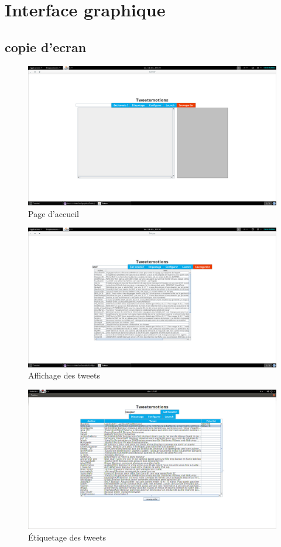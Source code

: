 \documentclass[a4paper,10pt]{report}
\begin{document}
  \section{Interface graphique}
    \subsection{copie d'ecran}
      \begin{figure}[H]
	\centering
	\includegraphics[scale=0.2]{impressions-ecran/accueil.png}
	\caption{Page d'accueil}
	\label{accueil}
      \end{figure}
      \begin{figure}[H]
	\centering
	\includegraphics[scale=0.2]{impressions-ecran/tweets.png}
	\caption{Affichage des tweets}
	\label{tweets}
      \end{figure}
      \begin{figure}[H]
	\centering
	\includegraphics[scale=0.2]{impressions-ecran/etiquetage.png}
	\caption{Étiquetage des tweets}
	\label{etiquetage}
      \end{figure}
\end{document}
